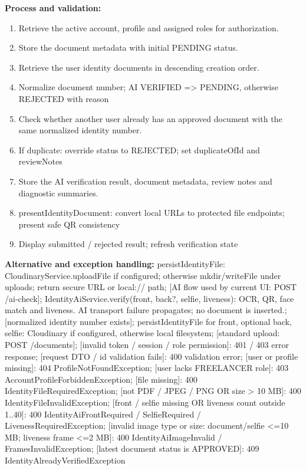 \textbf{Process and validation:}
\begin{enumerate}
\item Retrieve the active account, profile and assigned roles for authorization.
\item Store the document metadata with initial PENDING status.
\item Retrieve the user identity documents in descending creation order.
\item Normalize document number; AI VERIFIED =\allowbreak{}> PENDING, otherwise REJECTED with reason
\item Check whether another user already has an approved document with the same normalized identity number.
\item If duplicate: override status to REJECTED; set duplicate\allowbreak{}Of\allowbreak{}Id and review\allowbreak{}Notes
\item Store the AI verification result, document metadata, review notes and diagnostic summaries.
\item present\allowbreak{}Identity\allowbreak{}Document: convert local URLs to protected file endpoints; present safe QR consistency
\item Display submitted /\allowbreak{} rejected result; refresh verification state
\end{enumerate}
\textbf{Alternative and exception handling:} persist\allowbreak{}Identity\allowbreak{}File: Cloudinary\allowbreak{}Service.upload\allowbreak{}File if configured; otherwise mkdir/\allowbreak{}write\allowbreak{}File under uploads; return secure URL or local:/\allowbreak{}/\allowbreak{} path; [AI flow used by current UI: POST /\allowbreak{}ai-check]; Identity\allowbreak{}Ai\allowbreak{}Service.verify(front, back?, selfie, liveness): OCR, QR, face match and liveness. AI transport failure propagates; no document is inserted.; [normalized identity number exists]; persist\allowbreak{}Identity\allowbreak{}File for front, optional back, selfie: Cloudinary if configured, otherwise local filesystem; [standard upload: POST /\allowbreak{}documents]; [invalid token /\allowbreak{} session /\allowbreak{} role permission]: 401 /\allowbreak{} 403 error response; [request DTO /\allowbreak{} id validation fails]: 400 validation error; [user or profile missing]: 404 Profile\allowbreak{}Not\allowbreak{}Found\allowbreak{}Exception; [user lacks FREELANCER role]: 403 Account\allowbreak{}Profile\allowbreak{}Forbidden\allowbreak{}Exception; [file missing]: 400 Identity\allowbreak{}File\allowbreak{}Required\allowbreak{}Exception; [not PDF /\allowbreak{} JPEG /\allowbreak{} PNG OR size > 10 MB]: 400 Identity\allowbreak{}File\allowbreak{}Invalid\allowbreak{}Exception; [front /\allowbreak{} selfie missing OR liveness count outside 1..40]: 400 Identity\allowbreak{}Ai\allowbreak{}Front\allowbreak{}Required /\allowbreak{} Selfie\allowbreak{}Required /\allowbreak{} Liveness\allowbreak{}Required\allowbreak{}Exception; [invalid image type or size: document/\allowbreak{}selfie <=\allowbreak{}10 MB; liveness frame <=\allowbreak{}2 MB]: 400 Identity\allowbreak{}Ai\allowbreak{}Image\allowbreak{}Invalid /\allowbreak{} Frames\allowbreak{}Invalid\allowbreak{}Exception; [latest document status is APPROVED]: 409 Identity\allowbreak{}Already\allowbreak{}Verified\allowbreak{}Exception

